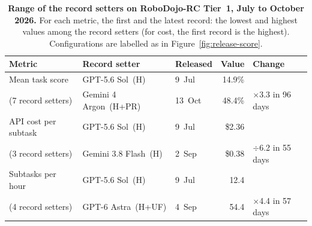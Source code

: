 \begin{table}[t]
  \centering
  \small
  \caption{\textbf{Range of the record setters on RoboDojo-RC Tier~1, July to October 2026.} For each metric, the first and the latest record: the lowest and highest values among the record setters (for cost, the first record is the highest). Configurations are labelled as in Figure~\ref{fig:release-score}.}
  \label{tab:release-records}
  \begin{tabular}{@{}lllrl@{}}
    \toprule
    Metric & Record setter & Released & Value & Change \\
    \midrule
    Mean task score & GPT-5.6 Sol~(H) & 9~Jul & 14.9\% & \\
    \quad (7 record setters) & Gemini 4 Argon~(H+PR) & 13~Oct & 48.4\% & $\times$3.3 in 96 days \\
    \midrule
    API cost per subtask & GPT-5.6 Sol~(H) & 9~Jul & \$2.36 & \\
    \quad (3 record setters) & Gemini 3.8 Flash~(H) & 2~Sep & \$0.38 & $\div$6.2 in 55 days \\
    \midrule
    Subtasks per hour & GPT-5.6 Sol~(H) & 9~Jul & 12.4 & \\
    \quad (4 record setters) & GPT-6 Astra~(H+UF) & 4~Sep & 54.4 & $\times$4.4 in 57 days \\
    \bottomrule
  \end{tabular}
\end{table}

